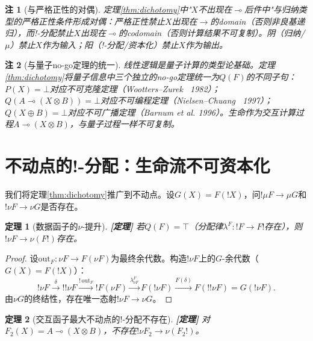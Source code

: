 \documentclass[11pt,a4paper]{article}
\newtheorem{theorem}{定理}
\newtheorem{remark}{注}
\newcommand{\lvl}[1]{\hfill\textbf{\footnotesize[#1]}}
\newcommand{\lvP}{\lvl{定理}}
\newcommand{\lolli}{\multimap}
\newcommand{\bang}{{!}}
\newcommand{\tensor}{\otimes}
\begin{document}
\begin{remark}[与严格正性的对偶]
定理\ref{thm:dichotomy}中"$X$不出现在$\lolli$后件中"与归纳类型的严格正性条件形成对偶：严格正性禁止$X$出现在$\to$的\emph{domain}（否则非良基递归），而!-分配禁止$X$出现在$\lolli$的\emph{codomain}（否则计算结果不可复制）。阴（归纳/$\mu$）禁止$X$作为输入；阳（!-分配/资本化）禁止$X$作为输出。
\end{remark}

\begin{remark}[与量子no-go定理的统一]
线性逻辑是量子计算的类型论基础。定理\ref{thm:dichotomy}将量子信息中三个独立的no-go定理统一为$Q(F)$的不同子句：$P(X)=\bot$对应不可克隆定理（Wootters--Zurek~\cite{wootters82} 1982）；$Q(A\lolli(X\tensor B))=\bot$对应不可编程定理（Nielsen--Chuang~\cite{nielsen00} 1997）；$Q(X\oplus B)=\bot$对应不可广播定理（Barnum et al. 1996）。生命作为交互计算过程$A\lolli(X\tensor B)$，与量子过程一样不可复制。
\end{remark}

\section{不动点的!-分配：生命流不可资本化}

我们将定理\ref{thm:dichotomy}推广到不动点。设$G(X)=F(\bang X)$，问$\bang\mu F\to\mu G$和$\bang\nu F\to\nu G$是否存在。

\begin{theorem}[数据函子的$\nu$-提升]\label{thm:nu-lift-data}\lvP
若$Q(F)=\top$（分配律$\lambda^F:\bang F\to F\bang$存在），则$\bang\nu F\to\nu(F\bang)$存在。
\end{theorem}

\begin{proof}
设$\mathrm{out}_F:\nu F\to F(\nu F)$为最终余代数。构造$\bang\nu F$上的$G$-余代数（$G(X)=F(\bang X)$）：
$$\bang\nu F\xrightarrow{\delta}\bang\bang\nu F\xrightarrow{\bang\,\mathrm{out}_F}\bang F(\nu F)\xrightarrow{\lambda^F_{\nu F}}F(\bang\nu F)\xrightarrow{F(\delta)}F(\bang\bang\nu F)=G(\bang\nu F).$$
由$\nu G$的终结性，存在唯一态射$\bang\nu F\to\nu G$。
\end{proof}

\begin{theorem}[交互函子最大不动点的!-分配不存在]\label{thm:nu-no-lift-life}\lvP
对$F_2(X)=A\lolli(X\tensor B)$，不存在$\bang\nu F_2\to\nu(F_2\bang)$。
\end{theorem}
\end{document}
